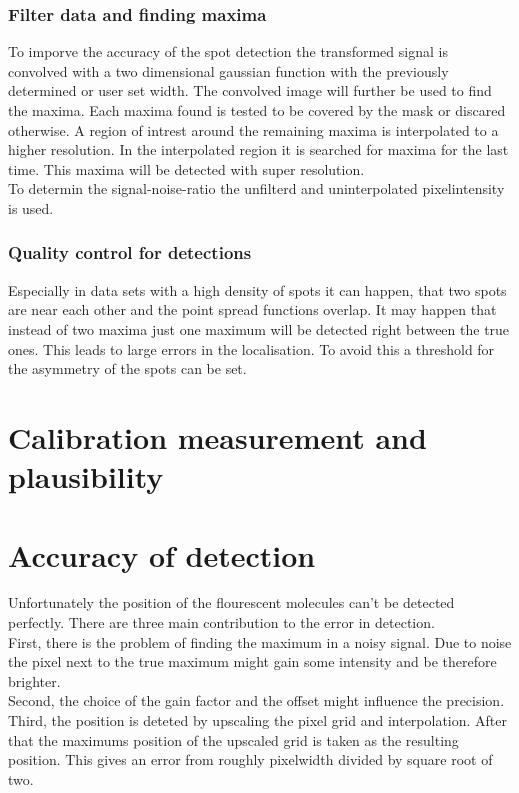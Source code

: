 \subsubsection{Filter data and finding maxima}
To imporve the accuracy of the spot detection the transformed signal is convolved with a two dimensional gaussian function with the previously determined or user set width. The convolved image will further be used to find the maxima. Each maxima found is tested to be covered by the mask or discared otherwise. A region of intrest around the remaining maxima is interpolated to a higher resolution. In the interpolated region  it is searched for maxima for the last time. This maxima will be detected with super resolution.\\
To determin the signal-noise-ratio the unfilterd and uninterpolated pixelintensity is used.

\subsubsection{Quality control for detections}
Especially in data sets with a high density of spots it can happen, that two spots are near each other and the point spread functions overlap. It may happen that instead of two maxima just one maximum will be detected right between the true ones. This leads to large errors in the localisation. To avoid this a threshold for the asymmetry of the spots can be set.




\section{Calibration measurement and plausibility}


\section{Accuracy of detection}
Unfortunately the position of the flourescent molecules can't be detected
perfectly. There are three main contribution to the error in detection.\\
First, there is the problem of finding the maximum in a noisy signal. Due to
noise the pixel next to the true maximum might gain some intensity and be
therefore brighter.\\
Second, the choice of the gain factor and the offset might influence the
precision.\\
Third, the position is deteted by upscaling the pixel grid and interpolation.
After that the maximums position of the upscaled grid is taken as the resulting
position. This gives an error from roughly pixelwidth divided by square root of
two.
